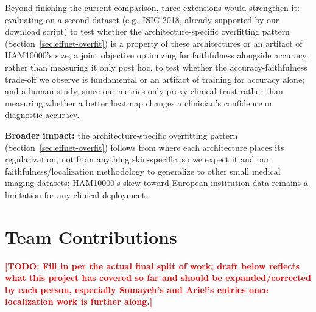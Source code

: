 \documentclass[10pt,twocolumn,letterpaper]{article}
\newcommand{\todo}[1]{\textcolor{red}{\textbf{[TODO: #1]}}}
\begin{document}
Beyond finishing the current comparison, three extensions would strengthen
it: evaluating on a second dataset (e.g.\ ISIC 2018, already supported by our
download script) to test whether the architecture-specific overfitting
pattern (Section~\ref{sec:effnet-overfit}) is a property of these
architectures or an artifact of HAM10000's size; a joint objective optimizing
for faithfulness alongside accuracy, rather than measuring it only post hoc,
to test whether the accuracy-faithfulness trade-off we observe is fundamental
or an artifact of training for accuracy alone; and a human study, since our
metrics only proxy clinical trust rather than measuring whether a better
heatmap changes a clinician's confidence or diagnostic accuracy.

\textbf{Broader impact:} the architecture-specific overfitting pattern
(Section~\ref{sec:effnet-overfit}) follows from where each architecture
places its regularization, not from anything skin-specific, so we expect it
and our faithfulness/localization methodology to generalize to other small
medical imaging datasets; HAM10000's skew toward European-institution data
remains a limitation for any clinical
deployment.

\section*{Team Contributions}

\todo{Fill in per the actual final split of work; draft below reflects what
this project has covered so far and should be expanded/corrected by each
person, especially Somayeh's and Ariel's entries once localization work is
further along.}
\end{document}
